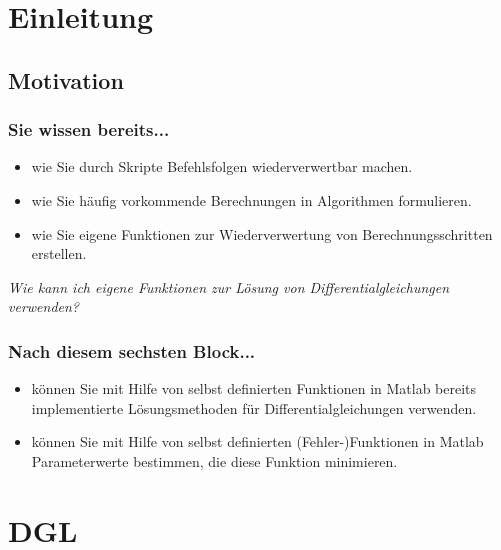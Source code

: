 



\setcounter{mchapter}{6}
\setcounter{mexercise}{0}


  

  \section{Einleitung}

  \subsection{Motivation}
  \begin{frame}
      \frametitle{Sie wissen bereits...}
      \begin{itemize}
          \item wie Sie durch Skripte Befehlsfolgen wiederverwertbar machen.
          \item wie Sie häufig vorkommende Berechnungen in Algorithmen formulieren.
          \item wie Sie eigene Funktionen zur Wiederverwertung von Berechnungsschritten erstellen.
      \end{itemize}

      \textit{Wie kann ich eigene Funktionen zur Lösung von Differentialgleichungen verwenden?}
  \end{frame}

  \begin{frame}
      \frametitle{Nach diesem sechsten Block...}
      \begin{itemize}
          \item können Sie mit Hilfe von selbst definierten Funktionen in Matlab bereits implementierte Lösungsmethoden für Differentialgleichungen verwenden.
          \item können Sie mit Hilfe von selbst definierten (Fehler-)Funktionen in Matlab Parameterwerte bestimmen, die diese Funktion minimieren.
      \end{itemize}
  \end{frame}


  \section{DGL}


